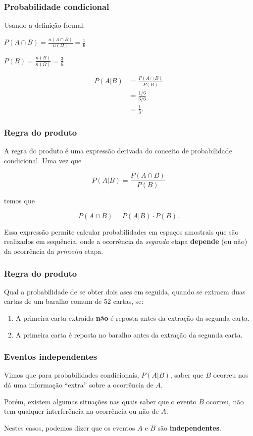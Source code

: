 \documentclass[11pt]{beamer}
\begin{document}
\begin{frame}
\frametitle{Probabilidade condicional}

Usando a definição formal:

\(P(A \cap B) = \frac{n(A \cap B)}{n(\Omega)} = \frac{1}{6}\)

\(P(B) = \frac{n(B)}{n(\Omega)} = \frac{3}{6}\)

\begin{align*}
P(A|B) &= \frac{P(A \cap B)}{P(B)} \\
&= \frac{1/6}{3/6} \\
&= \frac{1}{3}.
\end{align*}
\end{frame}

\begin{frame}
\frametitle{Regra do produto}

A regra do produto é uma expressão derivada do conceito de probabilidade
condicional. Uma vez que

\[
P(A|B) = \frac{P(A\cap B)}{P(B)}
\]

temos que

\[
P(A\cap B) = P(A|B) \cdot P(B)  .
\]

Essa expressão permite calcular probabilidades em espaços amostrais que
são realizados em sequência, onde a ocorrência da \emph{segunda} etapa
\textbf{depende} (ou não) da ocorrência da \emph{primeira} etapa.
\end{frame}

\begin{frame}
\frametitle{Regra do produto}

Qual a probabilidade de se obter dois ases em seguida, quando se extraem
duas cartas de um baralho comum de 52 cartas, se:

\begin{enumerate}
\def\labelenumi{\alph{enumi}.}
\item
  A primeira carta extraída \textbf{não} é reposta antes da extração da
  segunda carta.
\item
  A primeira carta é reposta no baralho antes da extração da segunda
  carta.
\end{enumerate}
\end{frame}

\begin{frame}
\frametitle{Eventos independentes}

Vimos que para probabilidades condicionais, \(P(A|B)\), saber que \(B\)
ocorreu nos dá uma informação ``extra'' sobre a ocorrência de \(A\).

Porém, existem algumas situações nas quais saber que o evento \(B\)
ocorreu, não tem qualquer interferência na ocorrência ou não de \(A\).

Nestes casos, podemos dizer que os eventos \(A\) e \(B\) são
\textbf{independentes}.
\end{frame}
\end{document}
